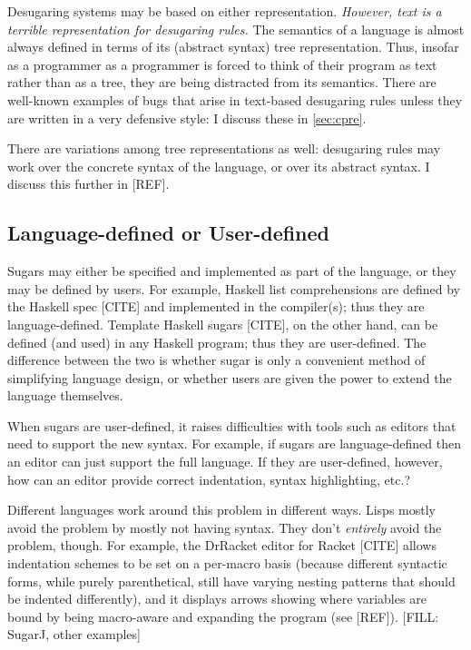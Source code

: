 Desugaring systems may be based on either representation.
\emph{However, text is a terrible representation for desugaring rules.}
The semantics of a language is almost always defined in terms of its
(abstract syntax) tree representation. Thus, insofar as a programmer
as a programmer is forced to think of their program as text rather
than as a tree, they are being distracted from its semantics. There
are well-known examples of bugs that arise in text-based desugaring
rules unless they are written in a very defensive style: I discuss
these in \ref{sec:cpre}.

There are variations among tree representations as well: desugaring
rules may work over the concrete syntax of the language, or over its
abstract syntax. I discuss this further in [REF].

\subsection{Language-defined or User-defined}

Sugars may either be specified and implemented as part of the
language, or they may be defined by users. For example, Haskell list
comprehensions are defined by the Haskell spec [CITE] and implemented
in the compiler(s); thus they are language-defined. Template Haskell
sugars [CITE], on the other hand, can be defined (and used) in any
Haskell program; thus they are user-defined. The difference between the two
is whether sugar is only a convenient method of simplifying language
design, or whether users are given the power to extend the language
themselves.

When sugars are user-defined, it raises difficulties with tools such
as editors that need to support the new syntax. For example, if sugars
are language-defined then an editor can just support the full
language. If they are user-defined, however, how can an editor provide
correct indentation, syntax highlighting, etc.?

Different languages work around this problem in different ways. Lisps
mostly avoid the problem by mostly not having syntax. They don't
\emph{entirely} avoid the problem, though. For example, the DrRacket editor for
Racket [CITE] allows indentation schemes to be set on a per-macro
basis (because different syntactic forms, while purely parenthetical,
still have varying nesting patterns that should be indented
differently), and it displays arrows showing where variables are bound
by being macro-aware and expanding the program (see [REF]).
[FILL: SugarJ, other examples]

